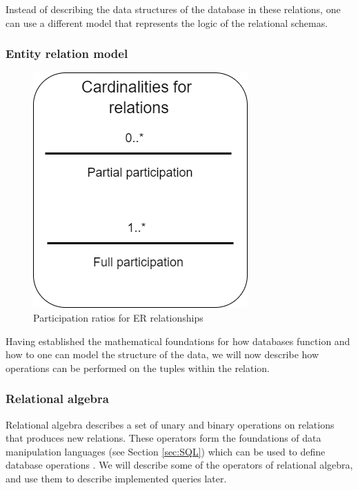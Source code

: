 Instead of describing the data structures of the database in these relations, one can use a different model that represents the logic of the relational schemas.

\subsubsection{Entity relation model}\label{sec:EntityRelationModel}
\begin{figure}
    \centering
    \includegraphics[scale=0.5]{Images/cardinalities.png}
    \caption{Participation ratios for ER relationships}
    \label{fig:ERDiagram_Cardinality}
\end{figure}


Having established the mathematical foundations for how databases function and how to one can model the structure of the data, we will now describe how operations can be performed on the tuples within the relation.

\subsubsection{Relational algebra}\label{sec:relationalAlgebra}
Relational algebra describes a set of unary and binary operations on relations that produces new relations.
These operators form the foundations of data manipulation languages (see Section \ref{sec:SQL}) which can be used to define database operations \cite[Chapter 6.2]{DBSBook}.
We will describe some of the operators of relational algebra, and use them to describe implemented queries later.

